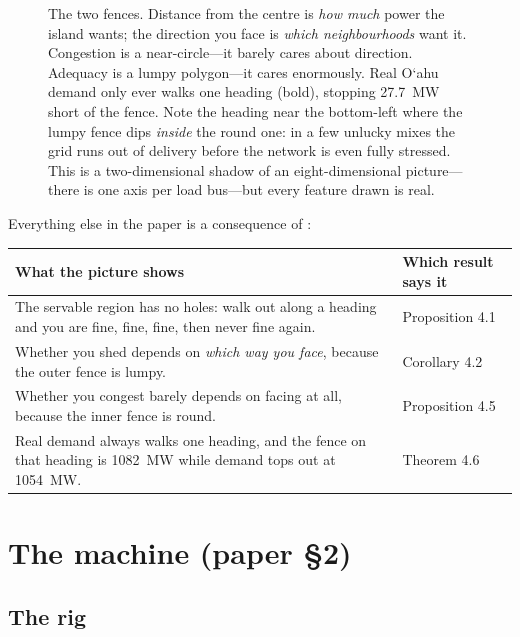 \documentclass[11pt,a4paper]{article}
\newcommand{\okina}{\textquoteleft}
\begin{document}
\begin{figure}[H]
\begin{tikzpicture}[scale=1.0]
\end{tikzpicture}
\caption{The two fences. Distance from the centre is \emph{how much} power the
island wants; the direction you face is \emph{which neighbourhoods} want it.
Congestion is a near-circle---it barely cares about direction. Adequacy is a
lumpy polygon---it cares enormously. Real O\okina ahu demand only ever walks one
heading (bold), stopping \SI{27.7}{\mega\watt} short of the fence. Note the
heading near the bottom-left where the lumpy fence dips \emph{inside} the round
one: in a few unlucky mixes the grid runs out of delivery before the network is
even fully stressed. This is a two-dimensional shadow of an eight-dimensional
picture---there is one axis per load bus---but every feature drawn is real.}
\label{fig:fences}
\end{figure}

\medskip
Everything else in the paper is a consequence of :

\begin{center}
\small
\begin{tabular}{@{}p{}p{}@{}}
\toprule
\textbf{What the picture shows} & \textbf{Which result says it} \\
\midrule
The servable region has no holes: walk out along a heading and you are fine, fine, fine, then never fine again. & Proposition 4.1 \\[0.35em]
Whether you shed depends on \emph{which way you face}, because the outer fence is lumpy. & Corollary 4.2 \\[0.35em]
Whether you congest barely depends on facing at all, because the inner fence is round. & Proposition 4.5 \\[0.35em]
Real demand always walks one heading, and the fence on that heading is \SI{1082}{\mega\watt} while demand tops out at \SI{1054}{\mega\watt}. & Theorem 4.6 \\
\bottomrule
\end{tabular}
\end{center}

\section{The machine (paper \S2)}

\subsection{The rig}
\end{document}
